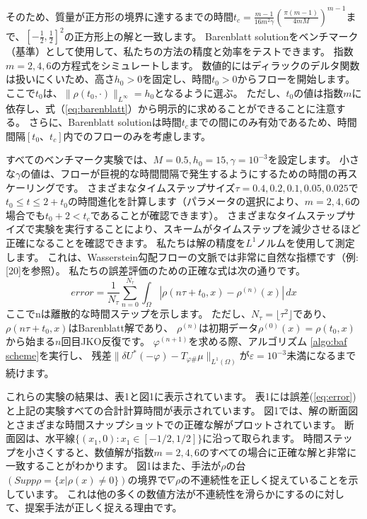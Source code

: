 \documentclass{jsarticle}
\theoremstyle{definition}
\begin{document}
そのため、質量が正方形の境界に達するまでの時間$t_c = \frac{m - 1}{16 m^2 \gamma}(\frac{\pi(m - 1)}{4mM})^{m - 1}$まで、$[- \frac{1}{2}, \frac{1}{2}]^2$の正方形上の解と一致します。
Barenblatt solutionをベンチマーク（基準）として使用して、私たちの方法の精度と効率をテストできます。
指数$m = 2, 4, 6$の方程式をシミュレートします。
数値的にはディラックのデルタ関数は扱いにくいため、高さ$h_0 > 0$を固定し、時間$t_0 > 0$からフローを開始します。
ここで$t_0$は、$\|\rho(t_0, \cdot)\|_{L^\infty} = h_0$となるように選ぶ。
ただし、$t_0$の値は指数$m$に依存し、式（\ref{eq:barenblatt}）から明示的に求めることができることに注意する。
さらに、Barenblatt solutionは時間$t_c$までの間にのみ有効であるため、時間間隔$[t_0、t_c]$内でのフローのみを考慮します。

すべてのベンチマーク実験では、$M = 0.5, h_0 = 15, \gamma = 10^{-3}$を設定します。
小さな$\gamma$の値は、フローが巨視的な時間間隔で発生するようにするための時間の再スケーリングです。
さまざまなタイムステップサイズ$\tau = 0.4, 0.2, 0.1, 0.05, 0.025$で$t_0 \le t \le 2 + t_0$の時間進化を計算します（パラメータの選択により、$m = 2, 4, 6$の場合でも$t_0 + 2 < t_c$であることが確認できます）。
さまざまなタイムステップサイズで実験を実行することにより、スキームがタイムステップを減少させるほど正確になることを確認できます。
私たちは解の精度を$L^1$ノルムを使用して測定します。
これは、Wasserstein勾配フローの文脈では非常に自然な指標です（例:[20]を参照）。
私たちの誤差評価のための正確な式は次の通りです。
\begin{equation}
    \label{eq:error}
    error = \frac{1}{N_\tau} \sum_{n = 0}^{N_\tau} \int_\Omega |\rho(n \tau + t_0, x) - \rho^{(n)}(x)|\, dx
\end{equation}
ここでnは離散的な時間ステップを示します。
ただし、$N_\tau = \lfloor \tau^2 \rfloor$であり、$\rho(n\tau + t_0, x)$はBarenblatt解であり、
$\rho^{(n)}$は初期データ$\rho^{(0)}(x) = \rho(t_0, x)$から始まる$n$回目JKO反復です。
$\varphi^{(n+1)}$を求める際、アルゴリズム \ref{algo:baf scheme}を実行し、
残差$\|\delta U^*(- \varphi) - T_{\varphi \#} \mu \|_{L^1(\Omega)}$が$\varepsilon = 10^{-3}$未満になるまで続けます。

これらの実験の結果は、表1と図1に表示されています。
表1には誤差(\ref{eq:error})と上記の実験すべての合計計算時間が表示されています。
図1では、解の断面図とさまざまな時間スナップショットでの正確な解がプロットされています。
断面図は、水平線$\{(x_1, 0) : x_1 \in [-1/2, 1/2]\}$に沿って取られます。
時間ステップを小さくすると、数値解が指数$m = 2, 4, 6$のすべての場合に正確な解と非常に一致することがわかります。
図1はまた、手法が$\rho$の台$(Supp \rho = \{ x | \rho(x) \neq 0\})$の境界で$\nabla\rho$の不連続性を正しく捉えていることを示しています。
これは他の多くの数値方法が不連続性を滑らかにするのに対して、提案手法が正しく捉える理由です。
\end{document}
